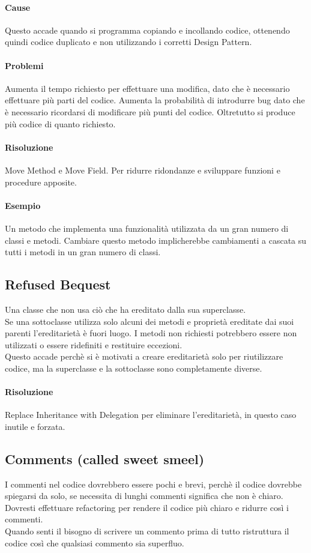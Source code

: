 \paragraph*{Cause} Questo accade quando si programma copiando e incollando codice, ottenendo quindi
codice duplicato e non utilizzando i corretti Design Pattern.
\paragraph*{Problemi} Aumenta il tempo richiesto per effettuare una modifica, dato che è necessario
effettuare più parti del codice. Aumenta la probabilità di introdurre bug dato che è necessario
ricordarsi di modificare più punti del codice. Oltretutto si produce più codice di quanto richiesto.
\paragraph*{Risoluzione} Move Method e Move Field. Per ridurre ridondanze e sviluppare funzioni e
procedure apposite.
\paragraph*{Esempio} Un metodo che implementa una funzionalità utilizzata da un gran numero 
di classi e metodi. Cambiare questo metodo implicherebbe cambiamenti a cascata su tutti i metodi
in un gran numero di classi.
\subsection{Refused Bequest}
Una classe che non usa ciò che ha ereditato dalla sua superclasse.\\
Se una sottoclasse utilizza solo alcuni dei metodi e proprietà ereditate dai
suoi parenti l'ereditarietà è fuori luogo. I metodi non richiesti potrebbero essere non
utilizzati o essere ridefiniti e restituire eccezioni.\\
Questo accade perchè si è motivati a creare ereditarietà solo per riutilizzare codice, ma
la superclasse e la sottoclasse sono completamente diverse.
\paragraph*{Risoluzione} Replace Inheritance with Delegation per eliminare l'ereditarietà, 
in questo caso inutile e forzata.
\subsection{Comments (called sweet smeel)}
I commenti nel codice dovrebbero essere pochi e brevi, perchè il codice dovrebbe spiegarsi
da solo, se necessita di lunghi commenti significa che non è chiaro. Dovresti effettuare
refactoring per rendere il codice più chiaro e ridurre così i commenti.\\
Quando senti il bisogno di scrivere un commento prima di tutto ristruttura il codice così 
che qualsiasi  commento sia superfluo.

